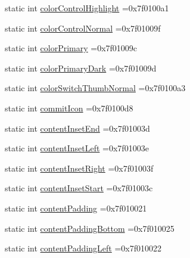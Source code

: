 \begin{DoxyCompactItemize}
\item 
static int \hyperlink{classandroid_1_1support_1_1graphics_1_1drawable_1_1animated_1_1R_1_1attr_ae63729e68c4c788cacdc5d30097aa26a}{color\+Control\+Highlight} =0x7f0100a1
\item 
static int \hyperlink{classandroid_1_1support_1_1graphics_1_1drawable_1_1animated_1_1R_1_1attr_a7b04f3c1f3b3cda93a8f18ffab082874}{color\+Control\+Normal} =0x7f01009f
\item 
static int \hyperlink{classandroid_1_1support_1_1graphics_1_1drawable_1_1animated_1_1R_1_1attr_adf97b41b3855381d9f0976f7aa60b62d}{color\+Primary} =0x7f01009c
\item 
static int \hyperlink{classandroid_1_1support_1_1graphics_1_1drawable_1_1animated_1_1R_1_1attr_a58a314e2f56c4c87ad681ba81b51e277}{color\+Primary\+Dark} =0x7f01009d
\item 
static int \hyperlink{classandroid_1_1support_1_1graphics_1_1drawable_1_1animated_1_1R_1_1attr_a639d6e9ccda64b68ee8abce8ec30bf63}{color\+Switch\+Thumb\+Normal} =0x7f0100a3
\item 
static int \hyperlink{classandroid_1_1support_1_1graphics_1_1drawable_1_1animated_1_1R_1_1attr_a60b45e5a3dc7d323c7379580b72cdfa7}{commit\+Icon} =0x7f0100d8
\item 
static int \hyperlink{classandroid_1_1support_1_1graphics_1_1drawable_1_1animated_1_1R_1_1attr_a788ca68eec8ddaf81ef1f80dfcb344d0}{content\+Inset\+End} =0x7f01003d
\item 
static int \hyperlink{classandroid_1_1support_1_1graphics_1_1drawable_1_1animated_1_1R_1_1attr_adc40ac5c175076d1fcf1c31c13dc0563}{content\+Inset\+Left} =0x7f01003e
\item 
static int \hyperlink{classandroid_1_1support_1_1graphics_1_1drawable_1_1animated_1_1R_1_1attr_aa82bed4b60d6909d63985423f4e3ef56}{content\+Inset\+Right} =0x7f01003f
\item 
static int \hyperlink{classandroid_1_1support_1_1graphics_1_1drawable_1_1animated_1_1R_1_1attr_ab5f1d709d7c1f296a1833189f94239a4}{content\+Inset\+Start} =0x7f01003c
\item 
static int \hyperlink{classandroid_1_1support_1_1graphics_1_1drawable_1_1animated_1_1R_1_1attr_ac32fe9207a7099d3bbab16c56c509fd3}{content\+Padding} =0x7f010021
\item 
static int \hyperlink{classandroid_1_1support_1_1graphics_1_1drawable_1_1animated_1_1R_1_1attr_afd240233c14457e1ef9cf950b6d59c6f}{content\+Padding\+Bottom} =0x7f010025
\item 
static int \hyperlink{classandroid_1_1support_1_1graphics_1_1drawable_1_1animated_1_1R_1_1attr_ac9caa8d2e0cb8b7819f5db0b824bc644}{content\+Padding\+Left} =0x7f010022

\end{DoxyCompactItemize}
